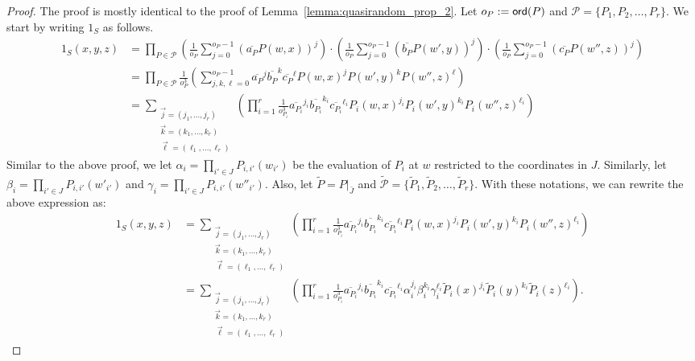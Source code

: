 \documentclass[11pt]{article}
\begin{document}
\begin{proof}
    The proof is mostly identical to the proof of Lemma~\ref{lemma:quasirandom_prop_2}. Let $o_P:={\sf ord}(P)$ and $\mathcal{P} = \{ P_1, P_2, \ldots, P_r\}$. We start by writing $1_S$ as follows.
\begin{align*}
         1_S(x, y, z) &= {\prod_{P\in \mathcal{P}}\left( \frac{1}{o_P} \sum_{j=0}^{o_P-1}\left(\overline{a_P}P(w,x)\right)^j\right)\cdot \left( \frac{1}{o_P} \sum_{j=0}^{o_P-1}\left(\overline{b_P}P(w',y)\right)^j\right)\cdot \left( \frac{1}{o_P} \sum_{j=0}^{o_P-1}\left(\overline{c_P}P(w'',z)\right)^j\right)}\\
          &= {\prod_{P\in \mathcal{P}} \frac{1}{o_P^3}\left(  \sum_{j, k, \ell=0}^{o_P-1}\overline{a_P}^j \overline{b_P}^k \overline{c_P}^\ell P(w,x)^j P(w',y)^k P(w'',z)^\ell\right)}\\
         &= \sum_{\substack{\vec{j} = (j_1, \ldots, j_r) \\ \vec{k} = (k_1, \ldots, k_r) \\ \vec{\ell} = (\ell_1, \ldots, \ell_r)}}{\left(  \prod_{i=1}^r \frac{1}{o_{P_i}^3}\overline{a_{P_i}}^{j_i} \overline{b_{P_i}}^{k_i} \overline{c_{P_i}}^{\ell_i} P_i(w,x)^{j_i} P_i(w',y)^{k_i} P_i(w'',z)^{\ell_i}\right)}
         \end{align*}
         Similar to the above proof, we let $\alpha_i = \prod_{i'\in J} P_{i,i'}(w_{i'})$ be the evaluation of $P_i$ at $w$ restricted to the coordinates in $J$. Similarly, let  $\beta_i = \prod_{i'\in J} P_{i,i'}(w'_{i'})$ and  $\gamma_i = \prod_{i'\in J} P_{i,i'}(w''_{i'})$. Also, let $\tilde{P} = P|_{\bar{J}}$ and $\tilde{\mathcal{P}} = \{ \tilde{P}_1, \tilde{P}_2, \ldots, \tilde{P}_r\}$. With these notations, we can rewrite the above expression as:
\begin{align*}
         1_S(x, y, z) &= \sum_{\substack{\vec{j} = (j_1, \ldots, j_r) \\ \vec{k} = (k_1, \ldots, k_r) \\ \vec{\ell} = (\ell_1, \ldots, \ell_r)}}{\left(  \prod_{i=1}^r \frac{1}{o_{P_i}^3}\overline{a_{P_i}}^{j_i} \overline{b_{P_i}}^{k_i} \overline{c_{P_i}}^{\ell_i} P_i(w,x)^{j_i} P_i(w',y)^{k_i} P_i(w'',z)^{\ell_i}\right)}\\
        &= \sum_{\substack{\vec{j} = (j_1, \ldots, j_r) \\ \vec{k} = (k_1, \ldots, k_r) \\ \vec{\ell} = (\ell_1, \ldots, \ell_r)}}{\left(  \prod_{i=1}^r \frac{1}{o_{P_i}^3}\overline{a_{P_i}}^{j_i} \overline{b_{P_i}}^{k_i} \overline{c_{P_i}}^{\ell_i} \alpha_i^{j_i}\beta_i^{k_i}\gamma_i^{\ell_i}\tilde{P}_i(x)^{j_i} \tilde{P}_i(y)^{k_i} \tilde{P}_i(z)^{\ell_i}\right)}.

\end{align*}
\end{proof}
\end{document}
